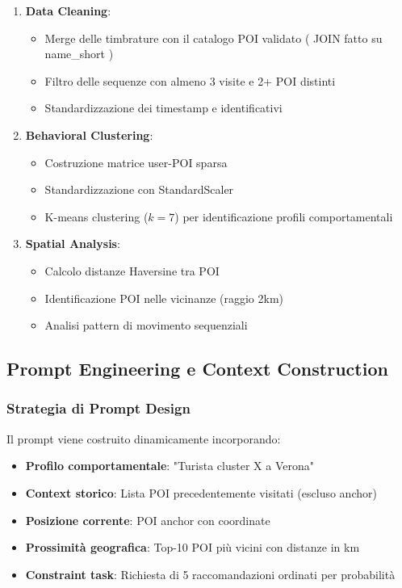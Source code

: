 \begin{enumerate}
\item \textbf{Data Cleaning}: 
   \begin{itemize}
   \item Merge delle timbrature con il catalogo POI validato ( JOIN fatto su name_short )
   \item Filtro delle sequenze con almeno 3 visite e 2+ POI distinti
   \item Standardizzazione dei timestamp e identificativi
   \end{itemize}

\item \textbf{Behavioral Clustering}:
   \begin{itemize}
   \item Costruzione matrice user-POI sparsa
   \item Standardizzazione con StandardScaler
   \item K-means clustering ($k=7$) per identificazione profili comportamentali
   \end{itemize}

\item \textbf{Spatial Analysis}:
   \begin{itemize}
   \item Calcolo distanze Haversine tra POI
   \item Identificazione POI nelle vicinanze (raggio 2km)
   \item Analisi pattern di movimento sequenziali
   \end{itemize}
\end{enumerate}

\subsection{Prompt Engineering e Context Construction}

\subsubsection{Strategia di Prompt Design}

Il prompt viene costruito dinamicamente incorporando:

\begin{itemize}
\item \textbf{Profilo comportamentale}: "Turista cluster X a Verona"
\item \textbf{Context storico}: Lista POI precedentemente visitati (escluso anchor)  
\item \textbf{Posizione corrente}: POI anchor con coordinate
\item \textbf{Prossimità geografica}: Top-10 POI più vicini con distanze in km
\item \textbf{Constraint task}: Richiesta di 5 raccomandazioni ordinati per probabilità
\end{itemize}

